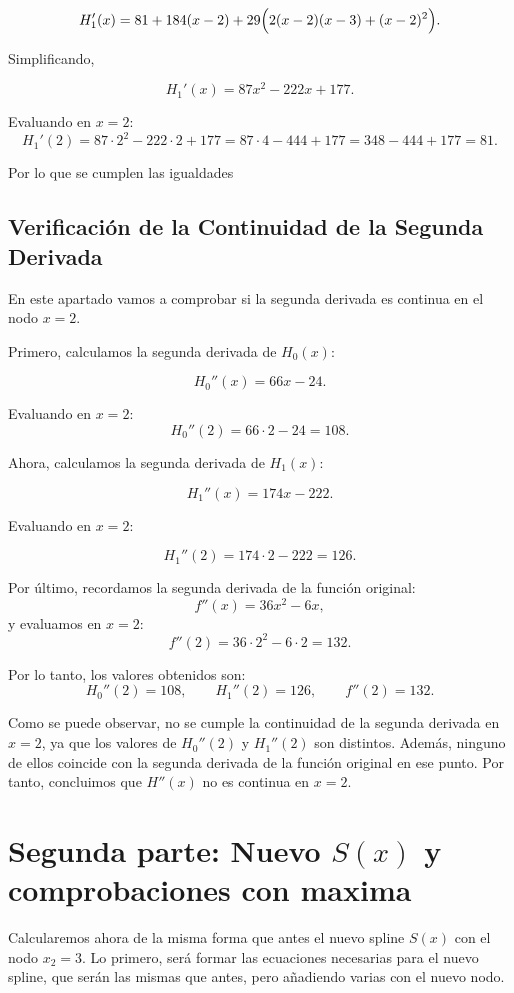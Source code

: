\documentclass{article}
\begin{document}
$$
H_1'(x)
=81+184(x-2)
+29\Bigl(2(x-2)(x-3)+(x-2)^2\Bigr).
$$

Simplificando,

$$
H_1'(x)=87x^2-222x+177.
$$

Evaluando en \(x=2\):
\[
H_1'(2)=87\cdot2^2-222\cdot2+177
=87\cdot4-444+177
=348-444+177
=81.
\]

Por lo que se cumplen las igualdades


\subsection{Verificación de la Continuidad de la Segunda Derivada}


En este apartado vamos a comprobar si la segunda derivada es continua en el nodo $x=2$.

Primero, calculamos la segunda derivada de $H_0(x)$:

$$
H_0''(x) = 66x - 24.
$$

Evaluando en $x=2$:
$$
H_0''(2) = 66 \cdot 2 - 24 = 108.
$$

Ahora, calculamos la segunda derivada de $H_1(x)$:

$$
H_1''(x) = 174x - 222.
$$

Evaluando en $x=2$:

$$
H_1''(2) = 174 \cdot 2 - 222 = 126.
$$

Por último, recordamos la segunda derivada de la función original:
$$
f''(x) = 36x^2 - 6x,
$$
y evaluamos en $x=2$:
$$
f''(2) = 36 \cdot 2^2 - 6 \cdot 2 = 132.
$$

Por lo tanto, los valores obtenidos son:
$$
H_0''(2) = 108, \qquad H_1''(2) = 126, \qquad f''(2) = 132.
$$

Como se puede observar, no se cumple la continuidad de la segunda derivada en $x=2$, ya que los valores de $H_0''(2)$ y $H_1''(2)$ son distintos. Además, ninguno de ellos coincide con la segunda derivada de la función original en ese punto. Por tanto, concluimos que $H''(x)$ no es continua en $x=2$.
\section{Segunda parte: Nuevo $S(x)$ y comprobaciones con maxima }


Calcularemos ahora de la misma forma que antes el nuevo spline \(S(x)\) con el nodo \(x_2=3\). Lo primero, será formar las ecuaciones necesarias para el nuevo spline, que serán las mismas que antes, pero añadiendo varias con el nuevo nodo.
\end{document}
